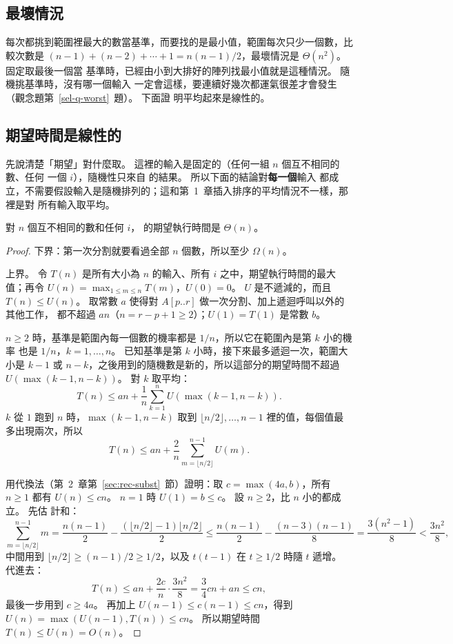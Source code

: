 \subsection{最壞情況}

每次都挑到範圍裡最大的數當基準，而要找的是最小值，範圍每次只少一個數，比較次數是
$(n-1) + (n-2) + \cdots + 1 = n(n-1)/2$，最壞情況是 $\Theta(n^2)$。 固定取最後一個當
基準時，已經由小到大排好的陣列找最小值就是這種情況。 隨機挑基準時，沒有哪一個輸入
一定會這樣，要連續好幾次都運氣很差才會發生（觀念題第~\ref{sel-q-worst}~題）。 下面證
明平均起來是線性的。

\subsection{期望時間是線性的}

先說清楚「期望」對什麼取。 這裡的輸入是固定的（任何一組 $n$ 個互不相同的數、任何
一個 $i$），隨機性只來自  的結果。 所以下面的結論對\textbf{每一個}輸入
都成立，不需要假設輸入是隨機排列的；這和第~1~章插入排序的平均情況不一樣，那裡是對
所有輸入取平均。

\begin{theorem}
\label{thm:sel-rselect}
對 $n$ 個互不相同的數和任何 $i$， 的期望執行時間是
$\Theta(n)$。
\end{theorem}

\begin{proof}
下界：第一次分割就要看過全部 $n$ 個數，所以至少 $\Omega(n)$。

上界。 令 $T(n)$ 是所有大小為 $n$ 的輸入、所有 $i$ 之中，期望執行時間的最大值；再令
$U(n) = \max_{1 \le m \le n} T(m)$，$U(0) = 0$。 $U$ 是不遞減的，而且
$T(n) \le U(n)$。 取常數 $a$ 使得對 $A[p..r]$ 做一次分割、加上遞迴呼叫以外的其他工作，
都不超過 $a n$（$n = r - p + 1 \ge 2$）；$U(1) = T(1)$ 是常數 $b$。

$n \ge 2$ 時，基準是範圍內每一個數的機率都是 $1/n$，所以它在範圍內是第 $k$ 小的機率
也是 $1/n$，$k = 1, \ldots, n$。 已知基準是第 $k$ 小時，接下來最多遞迴一次，範圍大
小是 $k - 1$ 或 $n - k$，之後用到的隨機數是新的，所以這部分的期望時間不超過
$U(\max(k - 1, n - k))$。 對 $k$ 取平均：
\[
T(n) \le a n + \frac{1}{n} \sum_{k=1}^{n} U(\max(k - 1, n - k)).
\]
$k$ 從 $1$ 跑到 $n$ 時，$\max(k - 1, n - k)$ 取到 $\lfloor n/2 \rfloor, \ldots, n-1$
裡的值，每個值最多出現兩次，所以
\[
T(n) \le a n + \frac{2}{n} \sum_{m=\lfloor n/2 \rfloor}^{n-1} U(m).
\]

用代換法（第~2~章第~\ref{sec:rec-subst}~節）證明：取 $c = \max(4a, b)$，所有 $n \ge 1$ 都有
$U(n) \le cn$。 $n = 1$ 時 $U(1) = b \le c$。 設 $n \ge 2$，比 $n$ 小的都成立。 先估
計和：
\[
\sum_{m=\lfloor n/2 \rfloor}^{n-1} m
= \frac{n(n-1)}{2} - \frac{(\lfloor n/2 \rfloor - 1)\lfloor n/2 \rfloor}{2}
\le \frac{n(n-1)}{2} - \frac{(n-3)(n-1)}{8}
= \frac{3(n^2 - 1)}{8} < \frac{3n^2}{8},
\]
中間用到 $\lfloor n/2 \rfloor \ge (n-1)/2 \ge 1/2$，以及 $t(t-1)$ 在 $t \ge 1/2$ 時隨 $t$ 遞增。
代進去：
\[
T(n) \le a n + \frac{2c}{n} \cdot \frac{3n^2}{8} = \frac{3}{4} c n + a n \le c n,
\]
最後一步用到 $c \ge 4a$。 再加上 $U(n - 1) \le c(n-1) \le cn$，得到
$U(n) = \max(U(n-1), T(n)) \le cn$。 所以期望時間 $T(n) \le U(n) = O(n)$。
\end{proof}

